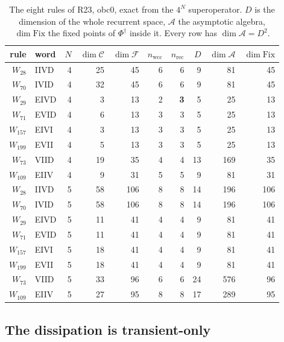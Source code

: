 \documentclass[11pt]{article}
\newcommand{\Phid}{\Phi^{\dagger}}
\newcommand{\C}{\mathcal{C}}
\newcommand{\F}{\mathcal{F}}
\newcommand{\A}{\mathcal{A}}
\theoremstyle{plain}
\theoremstyle{remark}
\begin{document}
\begin{table}[htbp]
\centering
\caption{The eight rules of R23, obc0, exact from the $4^N$ superoperator. $D$
is the dimension of the whole recurrent space, $\A$ the asymptotic algebra,
$\dim\mathrm{Fix}$ the fixed points of $\Phid$ inside it. Every row has
$\dim\A = D^2$.}
\label{tab:algebras}
\begin{tabular}{rlrrrrrrrr}
\toprule
rule & word & $N$ & $\dim\C$ & $\dim\F$ & $n_{\mathrm{wcc}}$ &
$n_{\mathrm{rec}}$ & $D$ & $\dim\A$ & $\dim\mathrm{Fix}$\\
\midrule
$W_{28}$  & IIVD & 4 & 25 & 45 & 6 & 6 &  9 &  81 &  45 \\
$W_{70}$  & IVID & 4 & 32 & 45 & 6 & 6 &  9 &  81 &  45 \\
$W_{29}$  & EIVD & 4 &  3 & 13 & 2 & \textbf{3} &  5 &  25 &  13 \\
$W_{71}$  & EVID & 4 &  6 & 13 & 3 & 3 &  5 &  25 &  13 \\
$W_{157}$ & EIVI & 4 &  3 & 13 & 3 & 3 &  5 &  25 &  13 \\
$W_{199}$ & EVII & 4 &  5 & 13 & 3 & 3 &  5 &  25 &  13 \\
$W_{73}$  & VIID & 4 & 19 & 35 & 4 & 4 & 13 & 169 &  35 \\
$W_{109}$ & EIIV & 4 &  9 & 31 & 5 & 5 &  9 &  81 &  31 \\
\midrule
$W_{28}$  & IIVD & 5 & 58 & 106 & 8 & 8 & 14 & 196 & 106 \\
$W_{70}$  & IVID & 5 & 58 & 106 & 8 & 8 & 14 & 196 & 106 \\
$W_{29}$  & EIVD & 5 & 11 &  41 & 4 & 4 &  9 &  81 &  41 \\
$W_{71}$  & EVID & 5 & 11 &  41 & 4 & 4 &  9 &  81 &  41 \\
$W_{157}$ & EIVI & 5 & 18 &  41 & 4 & 4 &  9 &  81 &  41 \\
$W_{199}$ & EVII & 5 & 18 &  41 & 4 & 4 &  9 &  81 &  41 \\
$W_{73}$  & VIID & 5 & 33 &  96 & 6 & 6 & 24 & 576 &  96 \\
$W_{109}$ & EIIV & 5 & 27 &  95 & 8 & 8 & 17 & 289 &  95 \\
\bottomrule
\end{tabular}
\end{table}

\subsection{The dissipation is transient-only}
\end{document}

